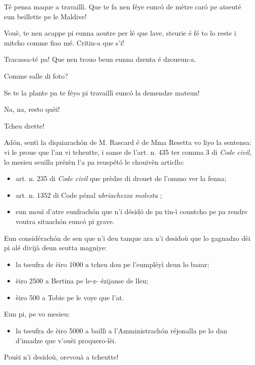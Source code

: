 \begin{drama}
\Eumprezeospeaks Té pensa maque a travaillì. Que te fa nen féye eunc\'o de mètre caró pe atseuté eun beillette pe le Maldive!

\Bertinaspeaks {} Vouè, te nen acappe pi eunna aoutre per lé que lave, steurie é fé to lo reste i mitcho comme fiao mé. Critin-a que s’i!

\Tobiespeaks Tracassa-té pa! Que nen trouo beun eunna dzenta é dzou\-eun-a.

\Simonspeaks Comme salle di foto?

\Eumprezeospeaks Se te la plante pa te féyo pi travaillì eunc\'o la demendze mateun!

\Simonspeaks Na, na, resto quèi!



\Pascalspeaks Tcheu drette!


\DzeudzoSenliquerspeaks Adón, sentì la diquiarachón de M. Rascard é de Mma Resetta vo liyo la sentensa: vi le proue que l’an vi tcheutte, i sanse de l’art. n. 435 ter comma 3 di \textit{Code civil}, lo mesieu seuilla prézèn l’a pa reuspétó le chouivèn articllo:
\begin{itemize}
\item[$\bullet$] art. n. 235 di \textit{Code civil} que prèdze di drouet de l’ommo ver la fenna;
\item[$\bullet$] art. n. 1352 di Code pénal \textit{ubriachezza molesta} \pionn;
\item[$\bullet$] eun mouì d’atre eunfrachón que n’i désidó de pa tin-ì coun\-tcho pe pa rendre voutra situachón eunc\'o pi grave.
\end{itemize}
Eun considérachón de sen que n’i deu tanque ara n'i desidoù que lo gagnadzo dèi pi alé divijà deun seutta magniye:
\begin{itemize}
\item[$\bullet$] la tseufra de èiro 1000 a tcheu dou pe l'eumpléyì deun lo bazar;
\item[$\bullet$] èiro 2500 a Bertina pe le-z- ézijanse de lleu;
\item[$\bullet$] èiro 500 a Tobie pe le voye que l'at.
\end{itemize}
Eun pi, pe vo mesieu:
\begin{itemize}
\item[$\bullet$]  la tseufra de èiro 5000 a baillì a l’Amministrachón réjonalla pe lo dan d’imadze que v'ouèi proquero-lèi.
\end{itemize}
Pouèi n'i desidoù, orevouà a tcheutte!


\end{drama}
